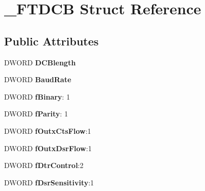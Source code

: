 \hypertarget{struct___f_t_d_c_b}{}\section{\+\_\+\+F\+T\+D\+CB Struct Reference}
\label{struct___f_t_d_c_b}
\subsection*{Public Attributes}
\begin{DoxyCompactItemize}
\item 
D\+W\+O\+RD {\bfseries D\+C\+Blength}\hypertarget{struct___f_t_d_c_b_a0d577b6cc351abc8313fd7eeaf7a4468}{}\label{struct___f_t_d_c_b_a0d577b6cc351abc8313fd7eeaf7a4468}

\item 
D\+W\+O\+RD {\bfseries Baud\+Rate}\hypertarget{struct___f_t_d_c_b_a3c59a8bdbb30e28505045b3186c89cbf}{}\label{struct___f_t_d_c_b_a3c59a8bdbb30e28505045b3186c89cbf}

\item 
D\+W\+O\+RD {\bfseries f\+Binary}\+: 1\hypertarget{struct___f_t_d_c_b_a66a920f15680e8bc01bc4b9d7e1e442a}{}\label{struct___f_t_d_c_b_a66a920f15680e8bc01bc4b9d7e1e442a}

\item 
D\+W\+O\+RD {\bfseries f\+Parity}\+: 1\hypertarget{struct___f_t_d_c_b_a8a81323a9b1ba34bd0cc2ae97d898c73}{}\label{struct___f_t_d_c_b_a8a81323a9b1ba34bd0cc2ae97d898c73}

\item 
D\+W\+O\+RD {\bfseries f\+Outx\+Cts\+Flow}\+:1\hypertarget{struct___f_t_d_c_b_a3e5166713d0405820849e27ba554ba7d}{}\label{struct___f_t_d_c_b_a3e5166713d0405820849e27ba554ba7d}

\item 
D\+W\+O\+RD {\bfseries f\+Outx\+Dsr\+Flow}\+:1\hypertarget{struct___f_t_d_c_b_af5ce76c2d358a419e028f8879aca3dcb}{}\label{struct___f_t_d_c_b_af5ce76c2d358a419e028f8879aca3dcb}

\item 
D\+W\+O\+RD {\bfseries f\+Dtr\+Control}\+:2\hypertarget{struct___f_t_d_c_b_a770cbe04afe4551d954b460e15bc253e}{}\label{struct___f_t_d_c_b_a770cbe04afe4551d954b460e15bc253e}

\item 
D\+W\+O\+RD {\bfseries f\+Dsr\+Sensitivity}\+:1\hypertarget{struct___f_t_d_c_b_a18de82101e19a3c2be9226489e7df0b2}{}\label{struct___f_t_d_c_b_a18de82101e19a3c2be9226489e7df0b2}


\end{DoxyCompactItemize}
